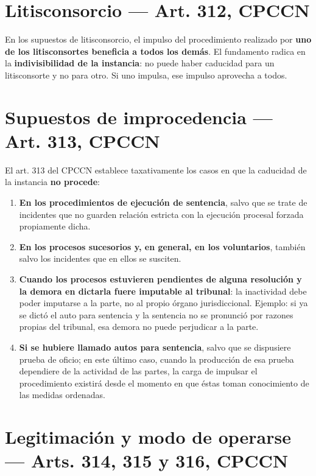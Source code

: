 \documentclass[12pt,oneside]{book}
\begin{document}
\section{Litisconsorcio --- Art. 312, CPCCN}

En los supuestos de litisconsorcio, el impulso del procedimiento realizado por \textbf{uno de los litisconsortes beneficia a todos los demás}. El fundamento radica en la \textbf{indivisibilidad de la instancia}: no puede haber caducidad para un litisconsorte y no para otro. Si uno impulsa, ese impulso aprovecha a todos.

\section{Supuestos de improcedencia --- Art. 313, CPCCN}

El art. 313 del CPCCN establece taxativamente los casos en que la caducidad de la instancia \textbf{no procede}:

\begin{enumerate}
    \item \textbf{En los procedimientos de ejecución de sentencia}, salvo que se trate de incidentes que no guarden relación estricta con la ejecución procesal forzada propiamente dicha.
    \item \textbf{En los procesos sucesorios y, en general, en los voluntarios}, también salvo los incidentes que en ellos se susciten.
    \item \textbf{Cuando los procesos estuvieren pendientes de alguna resolución y la demora en dictarla fuere imputable al tribunal}: la inactividad debe poder imputarse a la parte, no al propio órgano jurisdiccional. Ejemplo: si ya se dictó el auto para sentencia y la sentencia no se pronunció por razones propias del tribunal, esa demora no puede perjudicar a la parte.
    \item \textbf{Si se hubiere llamado autos para sentencia}, salvo que se dispusiere prueba de oficio; en este último caso, cuando la producción de esa prueba dependiere de la actividad de las partes, la carga de impulsar el procedimiento existirá desde el momento en que éstas toman conocimiento de las medidas ordenadas.
\end{enumerate}

\section{Legitimación y modo de operarse --- Arts. 314, 315 y 316, CPCCN}
\end{document}
